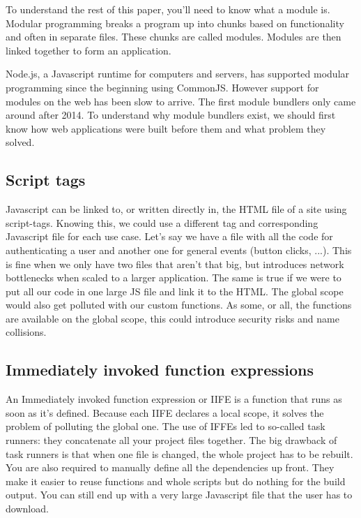 To understand the rest of this paper, you’ll need to know what a module is. Modular programming breaks a program up into chunks based on functionality and often in separate files. These chunks are called modules. Modules are then linked together to form an application. 

Node.js, a Javascript runtime for computers and servers, has supported modular programming since the beginning using CommonJS. However support for modules on the web has been slow to arrive. The first module bundlers only came around after 2014. To understand why module bundlers exist, we should first know how web applications were built before them and what problem they solved.

\subsection{Script tags}

Javascript can be linked to, or written directly in, the HTML file of a site using script-tags. Knowing this, we could use a different tag and corresponding Javascript file for each use case. Let’s say we have a file with all the code for authenticating a user and another one for general events (button clicks, ...). This is fine when we only have two files that aren’t that big, but introduces network bottlenecks when scaled to a larger application. The same is true if we were to put all our code in one large JS file and link it to the HTML. The global scope would also get polluted with our custom functions. As some, or all, the functions are available on the global scope, this could introduce security risks and name collisions. 

\subsection{Immediately invoked function expressions}

An Immediately invoked function expression or IIFE is a function that runs as soon as it’s defined. Because each IIFE declares a local scope, it solves the problem of polluting the global one. The use of IFFEs led to so-called task runners: they concatenate all your project files together. The big drawback of task runners is that when one file is changed, the whole project has to be rebuilt. You are also required to manually define all the dependencies up front. They make it easier to reuse functions and whole scripts but do nothing for the build output. You can still end up with a very large Javascript file that the user has to download. 

